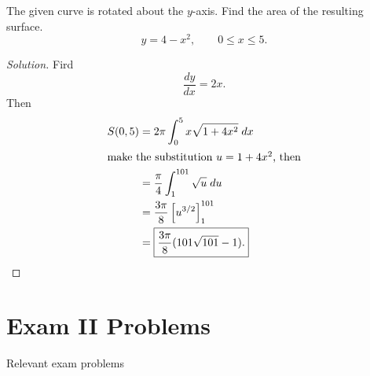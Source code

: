 \begin{problem}[WebAssign, HW 17, \# 8]
The given curve is rotated about the $y$-axis. Find the area of the
resulting surface.
\[
  y=4-x^2,\qquad 0\leq x\leq 5.
\]
\end{problem}
\begin{proof}[Solution]
Fird
\[
\frac{dy}{dx}=2x.
\]
Then
\begin{align*}
S(0,5)
&=2\pi\int_0^5 x\sqrt{1+4x^2}\;dx\\
\intertext{make the substitution $u=1+4x^2$, then}
&=\frac{\pi}{4}\int_1^{101}\sqrt{u}\;du\\
&=\frac{3\pi}{8}\left[u^{3/2}\right]_1^{101}\\
&=\boxed{\frac{3\pi}{8}(101\sqrt{101}-1).}
\end{align*}
\end{proof}
\chapter{Exam II Problems}
Relevant exam problems

